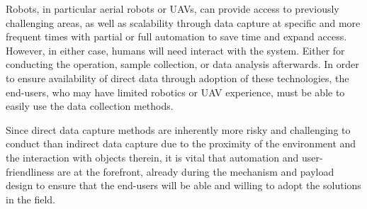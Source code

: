 



Robots, in particular aerial robots or UAVs, can provide access to previously challenging areas, as well as scalability through data capture at specific and more frequent times with partial or full automation to save time and expand access. However, in either case, humans will need interact with the system. Either for conducting the operation, sample collection, or data analysis afterwards. In order to ensure availability of direct data through adoption of these technologies, the end-users, who may have limited robotics or UAV experience, must be able to easily use the data collection methods.


Since direct data capture methods are inherently more risky and challenging to conduct than indirect data capture due to the proximity of the environment and the interaction with objects therein, it is vital that automation and user-friendliness are at the forefront, already during the mechanism and payload design to ensure that the end-users will be able and willing to adopt the solutions in the field.

